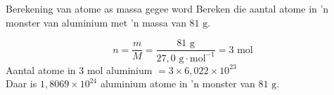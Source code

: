     \noindent
\label{m38717*secfhsst!!!underscore!!!id494}
      \noindent
      \begin{wex}{Berekening van atome as massa gegee word}{
Bereken die aantal atome in  'n monster van aluminium met  'n massa van $81 \text{ g}$.
      }
{
      \label{m38717*id277959}\nopagebreak\noindent{}
        
    \begin{equation*}
    n=\frac{m}{M}=\frac{81 \text{ g}}{27,0 \text{ g} \cdot \text{mol}^{-1}} = 3 \text{ mol}
      \end{equation*}
      \label{m38717*id278019}Aantal atome in 3 mol aluminium $=3 \times 6,022 \times 10^{23}$ \\
      \label{m38717*id278053}Daar is $1,8069 \times 10^{24}$ aluminium atome in  'n monster van $81 \text{ g}$.
}
    \end{wex}
    \noindent
\label{m38717*secfhsst!!!underscore!!!id539}
